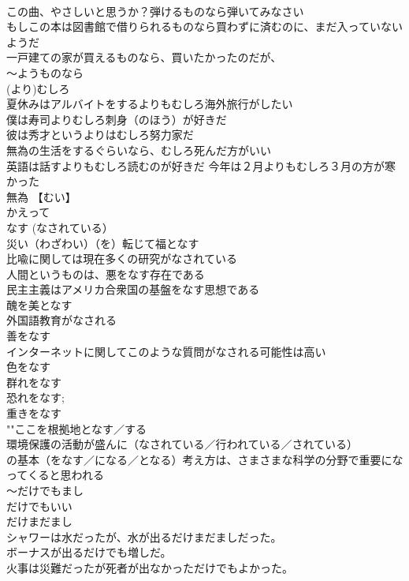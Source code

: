\documentclass[8pt]{extreport}
\begin{document}
\begin{CJK}{UTF8}{min}
\\	この曲、やさしいと思うか？弾けるものなら弾いてみなさい 
\\	もしこの本は図書館で借りられるものなら買わずに済むのに、まだ入っていないようだ 
\\	一戸建ての家が買えるものなら、買いたかったのだが、
\\	～ようものなら
\\	(より)むしろ	
\\	夏休みはアルバイトをするよりもむしろ海外旅行がしたい 
\\	僕は寿司よりむしろ刺身（のほう）が好きだ 
\\	彼は秀才というよりはむしろ努力家だ 
\\	無為の生活をするぐらいなら、むしろ死んだ方がいい 
\\	英語は話すよりもむしろ読むのが好きだ 今年は２月よりもむしろ３月の方が寒かった	
\\	無為 【むい】 
\\	かえって　
\\	なす (なされている） 
\\	災い（わざわい）（を）転じて福となす 
\\	比喩に関しては現在多くの研究がなされている 
\\	人間というものは、悪をなす存在である 
\\	民主主義はアメリカ合衆国の基盤をなす思想である 
\\	醜を美となす 
\\	外国語教育がなされる 
\\	善をなす 
\\	インターネットに関してこのような質問がなされる可能性は高い 
\\	色をなす 
\\	群れをなす 
\\	恐れをなす;
\\	重きをなす 
\\	""ここを根拠地となす／する 
\\	環境保護の活動が盛んに（なされている／行われている／されている） 
\\	の基本（をなす／になる／となる）考え方は、さまさまな科学の分野で重要になってくると思われる
\\	～だけでもまし　
\\	だけでもいい　
\\	だけまだまし	
\\	シャワーは水だったが、水が出るだけまだましだった。　
\\	ボーナスが出るだけでも増しだ。 
\\	火事は災難だったが死者が出なかっただけでもよかった。

\end{CJK}
\end{document}

